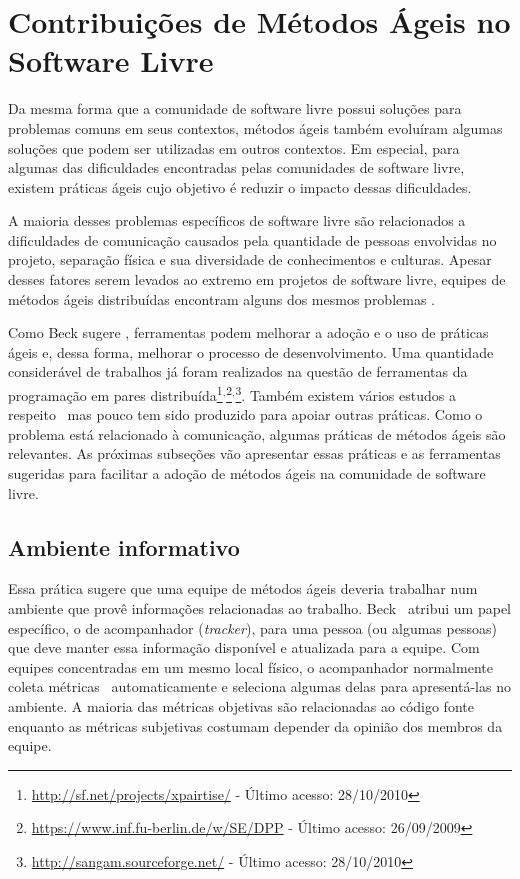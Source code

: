 \section{Contribuições de Métodos Ágeis no Software Livre}
\label{sec:agile-improve-os}

Da mesma forma que a comunidade de software livre possui soluções para
problemas comuns em seus contextos, métodos ágeis também evoluíram
algumas soluções que podem ser utilizadas em outros contextos. Em
especial, para algumas das dificuldades encontradas pelas comunidades
de software livre, existem práticas ágeis cujo objetivo é reduzir o
impacto dessas dificuldades.

A maioria desses problemas específicos de software livre são
relacionados a dificuldades de comunicação causados pela quantidade de
pessoas envolvidas no projeto, separação física e sua diversidade de
conhecimentos e culturas. Apesar desses fatores serem levados ao
extremo em projetos de software livre, equipes de métodos ágeis
distribuídas encontram alguns dos mesmos problemas
\cite{Sutherland2007,Maurer2002}.

Como Beck sugere \cite{Beck2008}, ferramentas podem melhorar a adoção
e o uso de práticas ágeis e, dessa forma, melhorar o processo de
desenvolvimento. Uma quantidade considerável de trabalhos já foram
realizados na questão de ferramentas da programação em pares
distribuída\footnote{\url{http://sf.net/projects/xpairtise/} - Último
  acesso:
  28/10/2010}$^{,}$\footnote{\url{https://www.inf.fu-berlin.de/w/SE/DPP}
  - Último acesso:
  26/09/2009}$^{,}$\footnote{\url{http://sangam.sourceforge.net/} -
  Último acesso: 28/10/2010}. Também existem vários estudos a
respeito~\cite{Nagappan2003} mas pouco tem sido produzido para apoiar
outras práticas. Como o problema está relacionado à comunicação,
algumas práticas de métodos ágeis são relevantes. As próximas
subseções vão apresentar essas práticas e as ferramentas sugeridas
para facilitar a adoção de métodos ágeis na comunidade de software
livre.

\subsection{Ambiente informativo}
\label{subsec:inform-worksp}

Essa prática sugere que uma equipe de métodos ágeis deveria trabalhar
num ambiente que provê informações relacionadas ao
trabalho. Beck~\cite{XP01} atribui um papel específico, o de
acompanhador (\emph{tracker}), para uma pessoa (ou algumas pessoas)
que deve manter essa informação disponível e atualizada para a
equipe. Com equipes concentradas em um mesmo local físico, o
acompanhador normalmente coleta métricas~\cite{Sato2007}
automaticamente e seleciona algumas delas para apresentá-las no
ambiente. A maioria das métricas objetivas são relacionadas ao código
fonte enquanto as métricas subjetivas costumam depender da opinião dos
membros da equipe.

